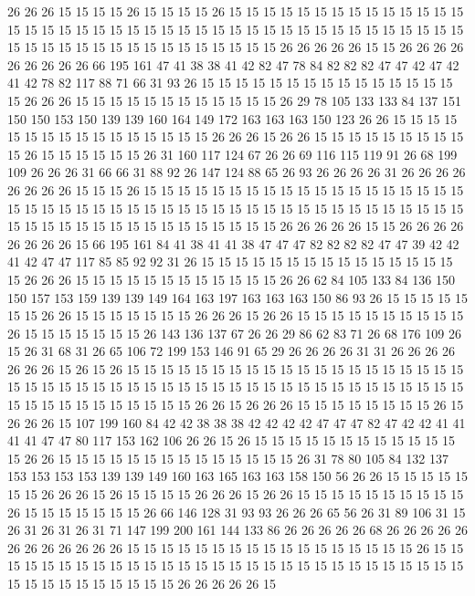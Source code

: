 26 26 26 15 15 15 15 26 15 15 15 15 26 15 15 15 15 15 15 15
15 15 15 15 15 15 15 15 15 15 15 15 15 15 15 15 15 15 15 15
15 15 15 15 15 15 15 15 15 15 15 15 15 15 15 15 15 15 15 15
15 15 15 15 15 15 15 15 15 15 26 26 26 26 26 15 15 26 26 26
26 26 26 26 26 26 66 195 161 47 41 38 38 41 42 82 47 78 84 82
82 82 47 47 42 47 42 41 42 78 82 117 88 71 66 31 93 26 15 15
15 15 15 15 15 15 15 15 15 15 15 15 15 15 26 26 26 15 15 15
15 15 15 15 15 15 15 15 15 26 29 78 105 133 133 84 137 151 150 150
153 150 139 139 160 164 149 172 163 163 163 150 123 26 26 15 15 15 15 15
15 15 15 15 15 15 15 15 15 15 15 26 26 26 15 26 26 15 15 15
15 15 15 15 15 15 15 26 15 15 15 15 15 15 26 31 160 117 124 67
26 26 69 116 115 119 91 26 68 199 109 26 26 26 31 66 66 31 88 92
26 147 124 88 65 26 93 26 26 26 26 31 26 26 26 26 26 26 26 26
15 15 15 26 15 15 15 15 15 15 15 15 15 15 15 15 15 15 15 15
15 15 15 15 15 15 15 15 15 15 15 15 15 15 15 15 15 15 15 15
15 15 15 15 15 15 15 15 15 15 15 15 15 15 15 15 15 15 15 15
15 15 15 15 15 15 26 26 26 26 26 15 15 26 26 26 26 26 26 26
26 15 66 195 161 84 41 38 41 41 38 47 47 47 82 82 82 82 47 47
39 42 42 41 42 47 47 117 85 85 92 92 31 26 15 15 15 15 15 15
15 15 15 15 15 15 15 15 15 15 26 26 26 15 15 15 15 15 15 15
15 15 15 15 15 26 26 62 84 105 133 84 136 150 150 157 153 159 139 139
149 164 163 197 163 163 163 150 86 93 26 15 15 15 15 15 15 15 26 26
15 15 15 15 15 15 15 26 26 26 15 26 26 15 15 15 15 15 15 15
15 15 15 26 15 15 15 15 15 15 15 26 143 136 137 67 26 26 29 86
62 83 71 26 68 176 109 26 15 26 31 68 31 26 65 106 72 199 153 146
91 65 29 26 26 26 26 31 31 26 26 26 26 26 26 26 15 26 15 26
15 15 15 15 15 15 15 15 15 15 15 15 15 15 15 15 15 15 15 15
15 15 15 15 15 15 15 15 15 15 15 15 15 15 15 15 15 15 15 15
15 15 15 15 15 15 15 15 15 15 15 15 15 15 15 15 15 15 26 26
15 26 26 26 15 15 15 15 15 15 15 15 26 15 26 26 26 15 107 199
160 84 42 42 38 38 38 42 42 42 42 47 47 47 82 47 42 42 41 41
41 41 47 47 80 117 153 162 106 26 26 15 26 15 15 15 15 15 15 15
15 15 15 15 15 15 26 26 15 15 15 15 15 15 15 15 15 15 15 15
15 15 26 31 78 80 105 84 132 137 153 153 153 153 139 139 149 160 163 165
163 163 158 150 56 26 26 15 15 15 15 15 15 15 26 26 26 15 26 15
15 15 15 26 26 26 15 26 26 15 15 15 15 15 15 15 15 15 15 26
15 15 15 15 15 15 15 26 66 146 128 31 93 93 26 26 26 65 56 26
31 89 106 31 15 26 31 26 31 26 31 71 147 199 200 161 144 133 86 26
26 26 26 26 68 26 26 26 26 26 26 26 26 26 26 26 26 15 15 15
15 15 15 15 15 15 15 15 15 15 15 15 15 15 26 15 15 15 15 15
15 15 15 15 15 15 15 15 15 15 15 15 15 15 15 15 15 15 15 15
15 15 15 15 15 15 15 15 15 15 15 15 15 15 26 26 26 26 26 15
